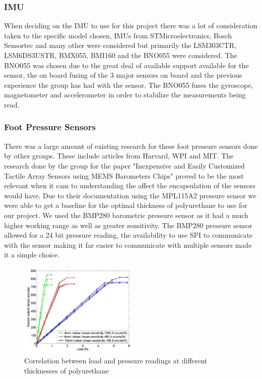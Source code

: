             
        \subsubsection{IMU}
            When deciding on the IMU to use for this project there was a lot of consideration taken to the specific model chosen, IMUs from STMicroelectronics, Bosch Sensortec and many other were considered but primarily the LSM303CTR, LSM6DS3USTR, BMX055, BMI160 and the BNO055\cite{BNO055} were considered. The BNO055 was chosen due to the great deal of available support available for the sensor, the on board fusing of the 3 major sensors on board and the previous experience the group has had with the sensor. The BNO055 fuses the gyroscope, magnetometer and accelerometer in order to stabilize the measurements being read.  
            
        \subsubsection{Foot Pressure Sensors}
        There was a large amount of existing research for these foot pressure sensors done by other groups. These include articles from Harvard\cite{chuah2012composite}\cite{chuah2014enabling}, WPI\cite{youssefian2014contact} and MIT\cite{tenzer2014inexpensive}. The research done by the group for the paper "Inexpensive and Easily Customized Tactile Array Sensors using MEMS Barometers Chips" \cite{chuah2012composite} proved to be the most relevant when it cam to understanding the affect the encapsulation of the sensors would have. Due to their documentation using the MPL115A2 pressure sensor we were able to get a baseline for the optimal thickness of polyurethane to use for our project. We used the BMP280 barometric pressure sensor \cite{BMP280} as it had a much higher working range as well as greater sensitivity. The BMP280 pressure sensor allowed for a 24 bit pressure reading, the availability to use SPI to communicate with the sensor making it far easier to communicate with multiple sensors made it a simple choice.
        \begin{figure}[H]
            \centering
            \includegraphics[width=0.5\textwidth]{figures/Load_vs_SensorvsThickness.png}
            \caption{Correlation between load and pressure readings at different thicknesses of polyurethane\cite{chuah2012composite}}
            \label{fig:ThicknessVSPressure}
        \end{figure}

